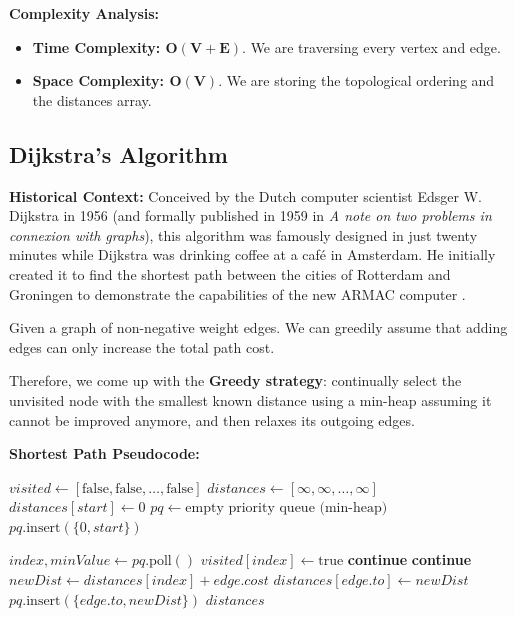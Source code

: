 \textbf{Complexity Analysis:}
\begin{itemize}
    \item \textbf{Time Complexity: $\mathbf{O(V + E)}$}. We are traversing every vertex and edge.
    \item \textbf{Space Complexity: $\mathbf{O(V)}$}. We are storing the topological ordering and the distances array.
\end{itemize}

\subsection{Dijkstra's Algorithm}
\textbf{Historical Context:} Conceived by the Dutch computer scientist Edsger W. Dijkstra in 1956 (and formally published in 1959 in \textit{A note on two problems in connexion with graphs}), this algorithm was famously designed in just twenty minutes while Dijkstra was drinking coffee at a café in Amsterdam. He initially created it to find the shortest path between the cities of Rotterdam and Groningen to demonstrate the capabilities of the new ARMAC computer \cite{dijkstra1959note,dijkstra2001interview}.

\vspace{0.2cm}
Given a graph of non-negative weight edges. We can greedily assume that adding edges can only increase the total path cost. 

Therefore, we come up with the \textbf{Greedy strategy}: continually select the unvisited node with the smallest known distance using a min-heap assuming it cannot be improved anymore, and then relaxes its outgoing edges.

\textbf{Shortest Path Pseudocode:}
\begin{algorithm}[H]
\caption{Dijkstra's Algorithm}
\begin{algorithmic}[1]
    \State $visited \gets [\text{false}, \text{false}, \dots , \text{false}]$ 
    \State $distances \gets [\infty, \infty, \dots , \infty]$ 
    \State $distances[start] \gets 0$
    \State $pq \gets \text{empty priority queue (min-heap)}$
    \State $pq.\text{insert}(\{0, start\})$
    
        \State $index, minValue \gets pq.\text{poll}()$
        \State $visited[index] \gets \text{true}$
            \State \textbf{continue}
        \EndIf
                \State \textbf{continue}
            \EndIf
            \State $newDist \gets distances[index] + edge.cost$
                \State $distances[edge.to] \gets newDist$
                \State $pq.\text{insert}(\{edge.to, newDist\})$
            \EndIf
        \EndFor
    \EndWhile
    \State \Return $distances$
\EndFunction
\end{algorithmic}
\end{algorithm}

